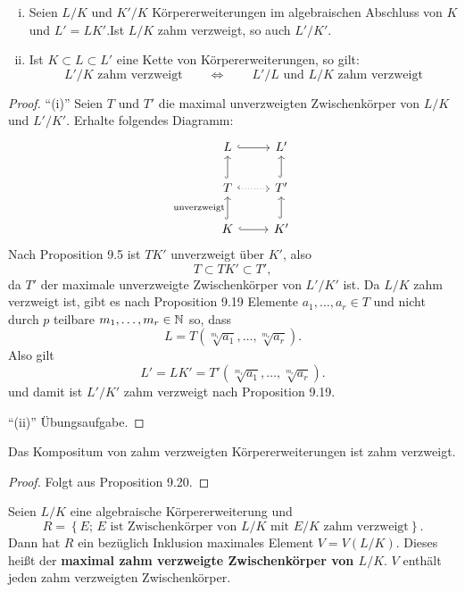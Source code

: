 

\begin{Prop}
	\begin{enumerate}[(i)]
		\item Seien $L/K$ und $K'/K$ Körpererweiterungen im algebraischen Abschluss von $K$ und $L'=LK'$.Ist $L/K$ zahm verzweigt, so auch $L'/K'$.
		\item Ist $K\subset L \subset L'$ eine Kette von Körpererweiterungen, so gilt:
		\[ L'/K \text{ zahm verzweigt} \qquad \Leftrightarrow \qquad L'/L \text{ und } L/K \text{ zahm verzweigt}
		\]
	\end{enumerate}
\end{Prop}

\begin{proof}
	\enquote{(i)} Seien $T$ und $T'$ die maximal unverzweigten Zwischenkörper von $L/K$ und $L'/K'$.
	Erhalte folgendes Diagramm:
	\[ \begin{tikzcd}
	L
	\arrow[hook]{r}
	& L'
	\\
	T
	\arrow[hook, dotted]{r}	
	\arrow[hook]{u}
	& T'
	\arrow[hook]{u}
	\\
	K
	\arrow[hook]{u}{\text{unverzweigt}}
	\arrow[hook]{r}
	& K'
	\arrow[hook]{u}
	\end{tikzcd}
	\]
	Nach Proposition 9.5 ist $TK'$ unverzweigt über $K'$, also
	\[ T \subset TK' \subset T',
	\]
	da $T'$ der maximale unverzweigte Zwischenkörper von $L'/K'$ ist.
	Da $L/K$ zahm verzweigt ist, gibt es nach Proposition 9.19 Elemente $a_1, \dots, a_r \in T$ und nicht durch $p$ teilbare $m_1, \dots, m_r \in \mathbb{N}$ so, dass
	\[ L = T \left( \sqrt[m_1]{a_1}, \dots, \sqrt[m_r]{a_r} \right).
	\]
	Also gilt 
	\[ L'=LK' = T'\left( \sqrt[m_1]{a_1}, \dots, \sqrt[m_r]{a_r} \right).
	\]
	und damit ist $L'/K'$ zahm verzweigt nach Proposition 9.19.
	
	\bigskip \enquote{(ii)} Übungsaufgabe.
\end{proof}

\begin{Kor}
	Das Kompositum von zahm verzweigten Körpererweiterungen ist zahm verzweigt.
\end{Kor}


\begin{proof}
	Folgt aus Proposition 9.20.
\end{proof}

\begin{Bemdef}
	Seien $L/K$ eine algebraische Körpererweiterung und
	\[ R = \left\{ E; \, E \text{ ist Zwischenkörper von $L/K$ mit $E/K$ zahm verzweigt}  \right\}.
	\]
	Dann hat $R$ ein bezüglich Inklusion maximales Element $V=V(L/K)$. Dieses heißt der \textbf{maximal zahm verzweigte Zwischenkörper von $L/K$}. $V$ enthält jeden zahm verzweigten Zwischenkörper.
\end{Bemdef}


